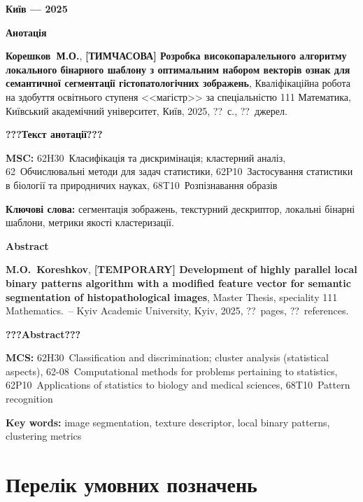 \documentclass{thesis}
\newcommand{\MyInitialName}{Корешков~М.О.}
\newcommand{\ThesisName}{[ТИМЧАСОВА] Розробка високопаралельного алгоритму локального бінарного шаблону з оптимальним набором векторів ознак для семантичної сегментації гістопатологічних зображень}
\newcommand{\NumPages}{??}
\newcommand{\NumCitations}{??}
\newcommand{\MyReverseInitialNameEn}{M.O.~Koreshkov}
\newcommand{\ThesisNameEn}{[TEMPORARY] Development of highly parallel local binary patterns algorithm with a modified feature vector for semantic segmentation of histopathological images}
\newcommand{\MSC}{62H30~Класифікація та дискримінація; кластерний аналіз, 62\nobreakdash-08~Обчислювальні методи для задач статистики, 62P10~Застосування статистики в біології та природничих науках, 68T10~Розпізнавання образів}
\newcommand{\MSCEn}{62H30~Classification and discrimination; cluster analysis (statistical aspects), 62-08~Computational methods for problems pertaining to statistics, 62P10~Applications of statistics to biology and medical sciences, 68T10~Pattern recognition}
\begin{document}
\vfill

\centerline{\bf Київ --- 2025}

\newpage

\begin{center}
\Large \bf Анотація
\end{center}

\noindent
\textbf{\MyInitialName}, \textbf{\ThesisName}, Кваліфікаційна робота на здобуття освітнього ступеня <<магістр>> за спеціальністю 111 Математика, Київський академічний університет, Київ, 2025, \NumPages~с., \NumCitations~джерел.

\bigskip


{\bf ???Текст анотації???}

\bigskip

\noindent
{\bf MSC:} \MSC

\bigskip

\noindent
{\bf Ключові слова:} сегментація зображень, текстурний дескриптор, локальні бінарні шаблони, метрики якості кластеризації.
\bigskip

\newpage

\begin{center}
\Large \bf Abstract
\end{center}

\noindent
\textbf{\MyReverseInitialNameEn}, \textbf{\ThesisNameEn}, Master Thesis, speciality 111 Mathematics.~--
Kyiv Academic University, Kyiv, 2025, \NumPages~pages, \NumCitations~references.

\bigskip
{\bf ???Abstract???}

\bigskip

\noindent
{\bf MCS:} \MSCEn %


\bigskip

\noindent
{\bf Key words:} image segmentation, texture descriptor, local binary patterns, clustering metrics


\newpage


\tableofcontents

\newpage

\section*{Перелік умовних позначень}
\end{document}

